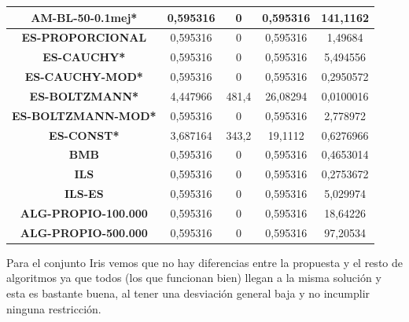 \documentclass[12pt, spanish]{article}
\begin{document}
\begin{table}[H]
\begin{tabular}{|c|c|c|c|c|}
\textbf{AM-BL-50-0.1mej*}   & 0,595316                  & 0                           & 0,595316               & 141,1162   \\ \hline
\textbf{ES-PROPORCIONAL}    & 0,595316                  & 0                           & 0,595316               & 1,49684    \\ \hline
\textbf{ES-CAUCHY*}         & 0,595316                  & 0                           & 0,595316               & 5,494556   \\ \hline
\textbf{ES-CAUCHY-MOD*}     & 0,595316                  & 0                           & 0,595316               & 0,2950572  \\ \hline
\textbf{ES-BOLTZMANN*}      & 4,447966                  & 481,4                       & 26,08294               & 0,0100016  \\ \hline
\textbf{ES-BOLTZMANN-MOD*}  & 0,595316                  & 0                           & 0,595316               & 2,778972   \\ \hline
\textbf{ES-CONST*}          & 3,687164                  & 343,2                       & 19,1112                & 0,6276966  \\ \hline
\textbf{BMB}                & 0,595316                  & 0                           & 0,595316               & 0,4653014  \\ \hline
\textbf{ILS}                & 0,595316                  & 0                           & 0,595316               & 0,2753672  \\ \hline
\textbf{ILS-ES}             & 0,595316                  & 0                           & 0,595316               & 5,029974   \\ \hline
\textbf{ALG-PROPIO-100.000} & 0,595316                  & 0                           & 0,595316               & 18,64226   \\ \hline
\textbf{ALG-PROPIO-500.000} & 0,595316                  & 0                           & 0,595316               & 97,20534   \\ \hline
\end{tabular}
\end{table}

Para el conjunto Iris vemos que no hay diferencias entre la propuesta y el resto de algoritmos ya que todos (los que funcionan bien) llegan a la misma solución y esta es bastante buena, al tener una desviación general baja y no incumplir ninguna restricción.
\end{document}
